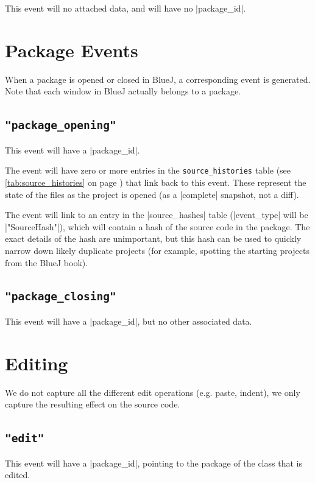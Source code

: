 \documentclass{report}
\newcommand{\myref}[1]{\autoref{#1} on page \pageref*{#1}}
\newcommand{\tabref}[1]{\lstinline|#1| table (see \myref{tab:#1})}
\newcommand{\intern}{This table may be interned, see \myref{def:intern}.}
\begin{document}
This event will no attached data, and will have no |package_id|.

\section{Package Events}

When a package is opened or closed in BlueJ, a corresponding event is
generated.  Note that each window in BlueJ actually belongs to a package.

\subsection{\lstinline!"package_opening"!}

This event will have a |package_id|.

The event will have zero or more entries in the \tabref{source_histories} that
link back to this event.  These represent the state of the files as the project is
opened (as a |complete| snapshot, not a diff).

The event will link to an entry in the |source_hashes| table
(|event_type| will be |"SourceHash"|), which will contain a hash of
the source code in the package.  The exact details of the hash are
unimportant, but this hash can be used to quickly narrow down likely
duplicate projects (for example, spotting the starting projects from
the BlueJ book).


\subsection{\lstinline!"package_closing"!}

This event will have a |package_id|, but no other associated data.


\section{Editing}

We do not capture all the different edit operations (e.g. paste, indent), we
only capture the resulting effect on the source code.

\subsection{\lstinline!"edit"!}

This event will have a |package_id|, pointing to the package of the class that
is edited.
\end{document}
